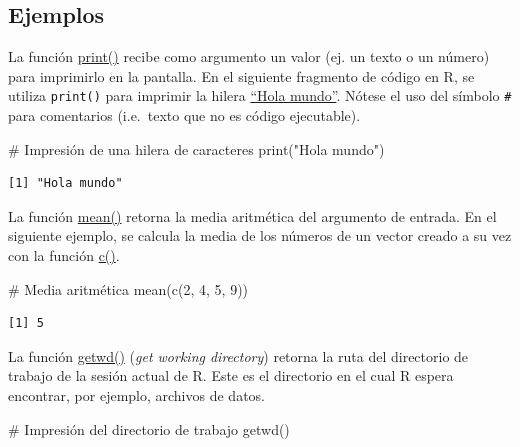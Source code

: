 \documentclass[
  letterpaper,
  DIV=11,
  numbers=noendperiod]{scrreprt}
\newenvironment{Shaded}{\begin{snugshade}}{\end{snugshade}}
\newcommand{\CommentTok}[1]{\textcolor[rgb]{0.37,0.37,0.37}{#1}}
\newcommand{\DecValTok}[1]{\textcolor[rgb]{0.68,0.00,0.00}{#1}}
\newcommand{\FunctionTok}[1]{\textcolor[rgb]{0.28,0.35,0.67}{#1}}
\newcommand{\NormalTok}[1]{\textcolor[rgb]{0.00,0.23,0.31}{#1}}
\newcommand{\StringTok}[1]{\textcolor[rgb]{0.13,0.47,0.30}{#1}}
\begin{document}
\hypertarget{ejemplos}{%
\subsection{Ejemplos}\label{ejemplos}}

La función \href{https://rdrr.io/r/base/print.html}{print()} recibe como
argumento un valor (ej. un texto o un número) para imprimirlo en la
pantalla. En el siguiente fragmento de código en R, se utiliza
\texttt{print()} para imprimir la hilera
\href{https://en.wikipedia.org/wiki/\%22Hello,_World!\%22_program}{``Hola
mundo''}. Nótese el uso del símbolo \texttt{\#} para comentarios
(i.e.~texto que no es código ejecutable).

\begin{Shaded}
\begin{Highlighting}[]
\CommentTok{\# Impresión de una hilera de caracteres}
\FunctionTok{print}\NormalTok{(}\StringTok{"Hola mundo"}\NormalTok{)}
\end{Highlighting}
\end{Shaded}

\begin{verbatim}
[1] "Hola mundo"
\end{verbatim}

La función \href{https://rdrr.io/r/base/mean.html}{mean()} retorna la
media aritmética del argumento de entrada. En el siguiente ejemplo, se
calcula la media de los números de un vector creado a su vez con la
función \href{https://rdrr.io/r/base/c.html}{c()}.

\begin{Shaded}
\begin{Highlighting}[]
\CommentTok{\# Media aritmética}
\FunctionTok{mean}\NormalTok{(}\FunctionTok{c}\NormalTok{(}\DecValTok{2}\NormalTok{, }\DecValTok{4}\NormalTok{, }\DecValTok{5}\NormalTok{, }\DecValTok{9}\NormalTok{))}
\end{Highlighting}
\end{Shaded}

\begin{verbatim}
[1] 5
\end{verbatim}

La función \href{https://rdrr.io/r/base/getwd.html}{getwd()} (\emph{get
working directory}) retorna la ruta del directorio de trabajo de la
sesión actual de R. Este es el directorio en el cual R espera encontrar,
por ejemplo, archivos de datos.

\begin{Shaded}
\begin{Highlighting}[]
\CommentTok{\# Impresión del directorio de trabajo}
\FunctionTok{getwd}\NormalTok{()}
\end{Highlighting}
\end{Shaded}
\end{document}
